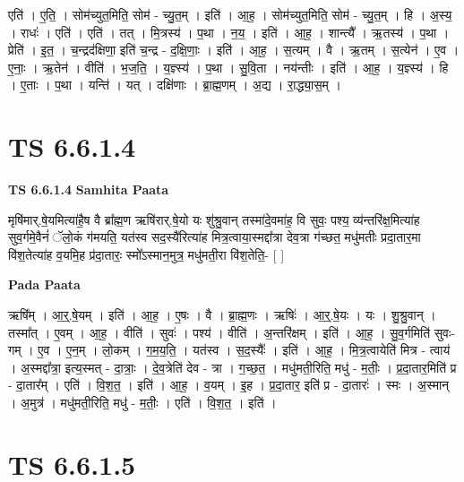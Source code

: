 \documentclass[17pt]{extarticle}
\begin{document}
एति॑ । ए॒ति॒ । सोम॑च्युत॒मिति॒ सोम॑ - च्यु॒त॒म् । इति॑ । आ॒ह॒ । सोम॑च्युत॒मिति॒ सोम॑ - च्यु॒त॒म् । हि । अ॒स्य॒ । राधः॑ । एति॑ । एति॑ । तत् । मि॒त्रस्य॑ । प॒था । न॒य॒ । इति॑ । आ॒ह॒ । शान्त्यै᳚ । ऋ॒तस्य॑ । प॒था । प्रेति॑ । इ॒त॒ । च॒न्द्रद॑क्षिणा॒ इति॑ च॒न्द्र - द॒क्षि॒णाः॒ । इति॑ । आ॒ह॒ । स॒त्यम् । वै । ऋ॒तम् । स॒त्येन॑ । ए॒व । ए॒नाः॒ । ऋ॒तेन॑ । वीति॑ । भ॒ज॒ति॒ । य॒ज्ञ्स्य॑ । प॒था । सु॒वि॒ता । नय॑न्तीः । इति॑ । आ॒ह॒ । य॒ज्ञ्स्य॑ । हि । ए॒ताः । प॒था । यन्ति॑ । यत् । दक्षि॑णाः । ब्रा॒ह्म॒णम् । अ॒द्य । रा॒द्ध्या॒स॒म् ।  \newline





\section{ TS 6.6.1.4 }

\textbf{TS 6.6.1.4 } \newline
\textbf{Samhita Paata} \newline

मृषि॑मार्.षे॒यमित्या॑है॒ष वै ब्रा᳚ह्म॒ण ऋषि॑रार्.षे॒यो यः शु॑श्रु॒वान् तस्मा॑दे॒वमा॑ह॒ वि सुवः॒ पश्य॒ व्य॑न्तरि॑क्ष॒मित्या॑ह सुव॒र्गमे॒वैनं॑ ॅलो॒कं ग॑मयति॒ यत॑स्व सद॒स्यै॑रित्या॑ह मित्र॒त्वाया॒स्मद्दा᳚त्रा देव॒त्रा ग॑च्छत॒ मधु॑मतीः प्रदा॒तार॒मा वि॑श॒तेत्या॑ह व॒यमि॒ह प्र॑दा॒तारः॒ स्मो᳚ऽस्मान॒मुत्र॒ मधु॑मती॒रा वि॑श॒तेति॒- [  ] \newline

\textbf{Pada Paata} \newline

ऋषि᳚म् । आ॒र्॒.षे॒यम् । इति॑ । आ॒ह॒ । ए॒षः । वै । ब्रा॒ह्म॒णः । ऋषिः॑ । आ॒र्॒.षे॒यः । यः । शु॒श्रु॒वान् । तस्मा᳚त् । ए॒वम् । आ॒ह॒ । वीति॑ । सुवः॑ । पश्य॑ । वीति॑ । अ॒न्तरि॑क्षम् । इति॑ । आ॒ह॒ । सु॒व॒र्गमिति॑ सुवः-गम् । ए॒व । ए॒न॒म् । लो॒कम् । ग॒म॒य॒ति॒ । यत॑स्व । स॒द॒स्यैः᳚ । इति॑ । आ॒ह॒ । मि॒त्र॒त्वायेति॑ मित्र - त्वाय॑ । अ॒स्मद्दा᳚त्रा॒ इत्य॒स्मत् - दा॒त्राः॒ । दे॒व॒त्रेति॑ देव - त्रा । ग॒च्छ॒त॒ । मधु॑मती॒रिति॒ मधु॑ - म॒तीः॒ । प्र॒दा॒तार॒मिति॑ प्र - दा॒तार᳚म् । एति॑ । वि॒श॒त॒ । इति॑ । आ॒ह॒ । व॒यम् । इ॒ह । प्र॒दा॒तार॒ इति॑ प्र - दा॒तारः॑ । स्मः । अ॒स्मान् । अ॒मुत्र॑ । मधु॑मती॒रिति॒ मधु॑ - म॒तीः॒ । एति॑ । वि॒श॒त॒ । इति॑ ।  \newline





\section{ TS 6.6.1.5 }
\end{document}

